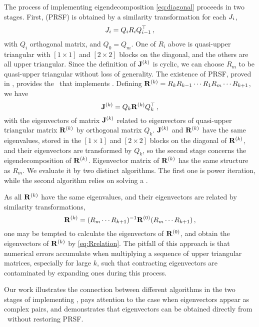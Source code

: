 The process of implementing eigendecomposition \eqref{eq:diagonal}
proceeds in two stages. First, {\prsf} (PRSF) is
obtained by a similarity transformation for each $J_i$,
\begin{equation}
  \label{eq:prsf}
  J_{i}=Q_{i}R_{i}Q_{i-1}^\top
  \,,
\end{equation}
with $Q_{i}$ orthogonal matrix, and $Q_{0}=Q_{m}$.
{One of $R_i$ above is quasi-upper triangular with
  $[1\!\times\! 1]$ and $[2\!\times\! 2]$ blocks on the
  diagonal, and the others are all upper triangular. Since the definition
  of $\mathbf{J}^{(k)}$ is cyclic, we can choose $R_m$ to be
  quasi-upper triangular without loss of generality.}
The existence of PRSF, proved in
, provides the \pqr\ that implements \psd.
Defining $\mathbf{R}^{(k)}=R_{k}R_{k-1}\cdots R_{1}R_{m}\cdots R_{k+1}$, we have
\begin{equation}
  \label{eq:pedrotation}
  \mathbf{J}^{(k)}=Q_{k}\mathbf{R}^{(k)}Q_{k}^\top
  \,,
\end{equation}
with the eigenvectors of matrix $\mathbf{J}^{(k)}$ related to eigenvectors
of quasi-upper triangular matrix $\mathbf{R}^{(k)}$ by orthogonal matrix
$Q_{k}$. $\mathbf{J}^{(k)}$ and $\mathbf{R}^{(k)}$ have the same eigenvalues,
stored in the $[1\!\times\! 1]$ and $[2\!\times\! 2]$ blocks on the
diagonal of $\mathbf{R}^{(k)}$, and their eigenvectors are transformed by
$Q_{k}$, so the second stage concerns the eigendecomposition of
$\mathbf{R}^{(k)}$. Eigenvector matrix of $\mathbf{R}^{(k)}$ has the same structure as
$R_{m}$. We evaluate it by two distinct algorithms. The first one is power
iteration, while the
second algorithm relies on solving a \pse{}.

As all $\mathbf{R}^{(k)}$ have the same eigenvalues, and their eigenvectors are
related by similarity transformations,
\begin{equation}
  \label{eq:Rrelation}
  \mathbf{R}^{(k)}=(R_{m}\cdots R_{k+1})^{-1}\mathbf{R}^{(0)}(R_{m}\cdots R_{k+1})
  \,,
\end{equation}
one may be tempted to calculate the eigenvectors of $\mathbf{R}^{(0)}$, and
obtain the eigenvectors of $\mathbf{R}^{(k)}$ by \eqref{eq:Rrelation}. The
pitfall of this approach is that numerical errors accumulate when
multiplying a sequence of upper triangular matrices, especially for large
$k$, {such that contracting eigenvectors are contaminated by expanding
  ones during this process}.

Our work illustrates the connection between different algorithms in the
two stages of implementing \ped, pays attention to the case when
eigenvectors appear as complex pairs, and demonstrates that eigenvectors
can be obtained directly from \pse\ without restoring PRSF.


